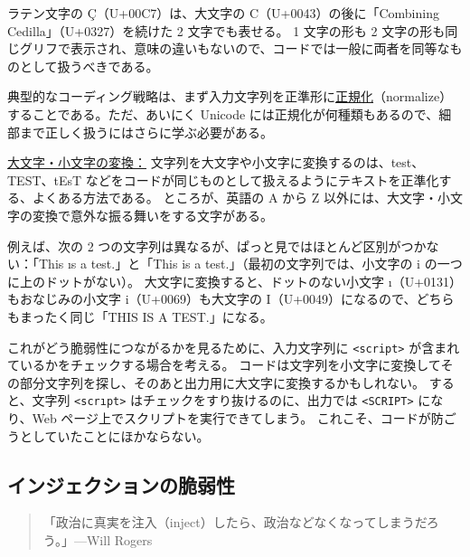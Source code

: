 \documentclass[uplatex]{jsarticle}
\def\label#1{}%
\begin{document}
\begin{exa}[Ç の 2 通りの表現]\label{exa:ch10-combining-cedilla}
ラテン文字の Ç（U+00C7）は、大文字の C（U+0043）の後に「Combining Cedilla」（U+0327）を続けた 2 文字でも表せる。
1 文字の形も 2 文字の形も同じグリフで表示され、意味の違いもないので、コードでは一般に両者を同等なものとして扱うべきである。
\end{exa}

典型的なコーディング戦略は、まず入力文字列を正準形に\underline{正規化}（normalize）することである。ただ、あいにく Unicode には正規化が何種類もあるので、細部まで正しく扱うにはさらに学ぶ必要がある。

\underline{大文字・小文字の変換：}
文字列を大文字や小文字に変換するのは、test、TEST、tEsT などをコードが同じものとして扱えるようにテキストを正準化する、よくある方法である。
ところが、英語の A から Z 以外には、大文字・小文字の変換で意外な振る舞いをする文字がある。

\begin{exa}\label{exa:ch10-dotless-i}
例えば、次の 2 つの文字列は異なるが、ぱっと見ではほとんど区別がつかない：「This ıs a test.」と「This is a test.」（最初の文字列では、小文字の i の一つに上のドットがない）。
大文字に変換すると、ドットのない小文字 ı（U+0131）もおなじみの小文字 i（U+0069）も大文字の I（U+0049）になるので、どちらもまったく同じ「THIS IS A TEST.」になる。

これがどう脆弱性につながるかを見るために、入力文字列に \verb|<script>| が含まれているかをチェックする場合を考える。
コードは文字列を小文字に変換してその部分文字列を探し、そのあと出力用に大文字に変換するかもしれない。
すると、文字列 \texttt{<scrıpt>} はチェックをすり抜けるのに、出力では \verb|<SCRIPT>| になり、Web ページ上でスクリプトを実行できてしまう。
これこそ、コードが防ごうとしていたことにほかならない。
\end{exa}

\subsection{インジェクションの脆弱性}\label{subsec:ch10-injection}

\begin{quote}
「政治に真実を注入（inject）したら、政治などなくなってしまうだろう。」---Will Rogers
\end{quote}
\end{document}
